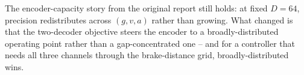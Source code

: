 \documentclass[11pt,a4paper]{article}
\begin{document}
The encoder-capacity story from the original report still holds: at fixed
$D{=}64$, precision redistributes across $(g, v, a)$ rather than growing.
What changed is that the two-decoder objective steers the encoder to a
broadly-distributed operating point rather than a gap-concentrated one -- and
for a controller that needs all three channels through the brake-distance
grid, broadly-distributed wins.
\end{document}
